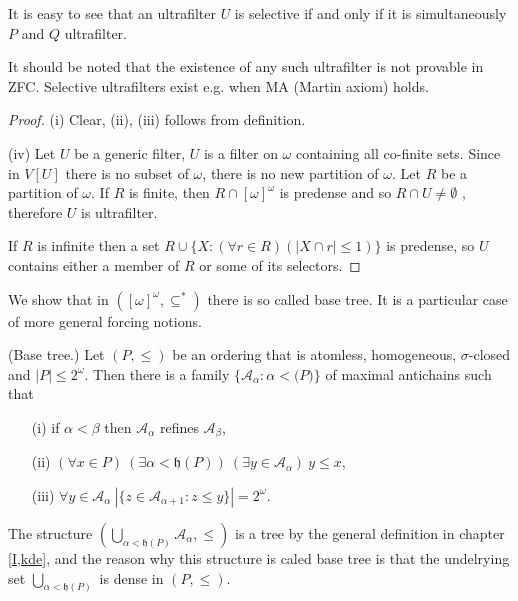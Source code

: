 It is easy to see that an ultrafilter $U$ is selective if and only if it is
simultaneously $P$ and $Q$ ultrafilter.

\smallskip

It should be noted that the existence of any such ultrafilter is not provable
in ZFC. Selective ultrafilters exist e.g. when MA (Martin axiom) holds.


\begin{proof}
\noindent (i) Clear, (ii), (iii) follows from definition.

\smallskip

\noindent (iv) Let $U$ be a generic filter, $U$ is a filter on $\omega$
containing all co-finite sets. Since in $V[U]$ there is no subset of
$\omega$, there is no new partition of $\omega$. Let $R$   be a partition
of $\omega$. If $R$ is finite, then $R \cap [\omega]^\omega$ is predense
and so $R \cap U \not = \emptyset$ , therefore $U$ is ultrafilter.

If $R$ is infinite then a set $R \cup \{ X : (\forall r \in R) (|X \cap r| \leq 1) \}$
is predense, so $U$ contains either a member of $R$ or some of
its selectors.
\end{proof}


We show that in $([\omega]^\omega,\subseteq^*)$ there is so called base tree.
It is a particular case of more general forcing notions.

\begin{proposition}{\rm (Base tree.)}\label{basetree}
 Let $(P,\leq)$ be an ordering that is atomless, homogeneous, $\sigma$-closed
 and $|P| \leq 2^\omega$. Then there is a family
 $\{ \mathcal A_\alpha : \alpha < \mathfrak (P) \}$ of maximal antichains
 such that
 \begin{itemize}
  \item[(i)] if $\alpha < \beta$ then $\mathcal A_\alpha$ refines  $\mathcal A_\beta$,
  \item[(ii)] $(\forall x \in P) \ (\exists \alpha < \mathfrak h(P)) \
	(\exists y \in \mathcal A_\alpha) \ y \leq x$,
  \item[(iii)] $\forall  y \in \mathcal A_\alpha \
	|\{z \in \mathcal A_{\alpha + 1} : z \leq y \}| = 2^\omega$.
 \end{itemize}
\end{proposition}

The structure $(\bigcup_{\alpha < \mathfrak h(P)} \mathcal A_\alpha, \leq)$
is a tree by the general definition in chapter \ref{I,kde}, and the reason why
this structure is caled base tree is that the undelrying set
$\bigcup_{\alpha < \mathfrak h(P)}$ is dense in $(P,\leq)$.

